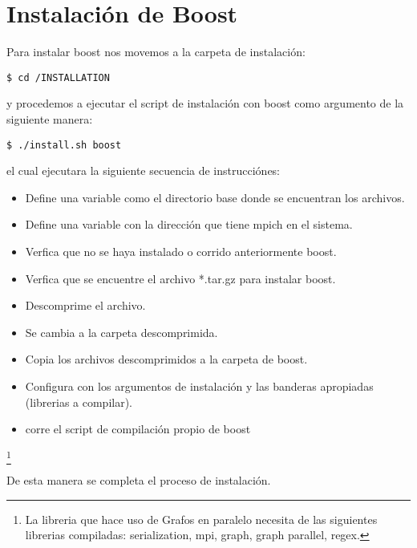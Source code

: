 \newpage



\newpage

\section{Instalación de Boost}

Para instalar boost nos movemos a la carpeta de instalación:

\begin{verbatim}
$ cd /INSTALLATION
\end{verbatim}

y procedemos a ejecutar el script de instalación con boost como argumento de la siguiente manera:

\begin{verbatim}
$ ./install.sh boost
\end{verbatim}

el cual ejecutara la siguiente secuencia de instrucciónes: 

\begin{itemize}
	\item Define una variable como el directorio base donde se encuentran los archivos.
	\item Define una variable con la dirección que tiene mpich en el sistema.
	\item Verfica que no se haya instalado o corrido anteriormente boost.
	\item Verfica que se encuentre el archivo *.tar.gz para instalar boost.
	\item Descomprime el archivo.
	\item Se cambia a la carpeta descomprimida.
	\item Copia los archivos descomprimidos a la carpeta de boost.
	\item Configura con los argumentos de instalación y las banderas apropiadas (librerias a compilar).
	\item corre el script de compilación propio de boost 
\end{itemize}
	
\footnote{La libreria que hace uso de Grafos en paralelo necesita de las siguientes librerias compiladas:  serialization, mpi, graph, graph parallel, regex. }

\newpage


De esta manera se completa el proceso de instalación. 
       
